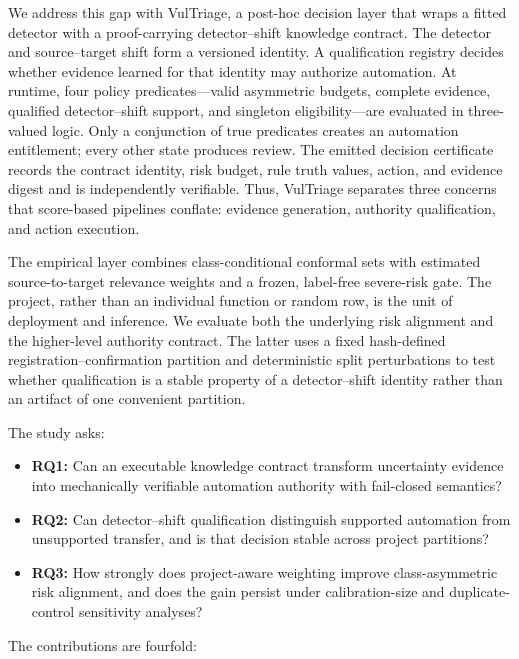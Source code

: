 \documentclass[preprint,12pt]{elsarticle}
\newcommand{\method}{VulTriage\xspace}
\begin{document}
We address this gap with \method, a post-hoc decision layer that wraps a fitted detector with a proof-carrying detector--shift knowledge contract. The detector and source--target shift form a versioned identity. A qualification registry decides whether evidence learned for that identity may authorize automation. At runtime, four policy predicates---valid asymmetric budgets, complete evidence, qualified detector--shift support, and singleton eligibility---are evaluated in three-valued logic. Only a conjunction of true predicates creates an automation entitlement; every other state produces review. The emitted decision certificate records the contract identity, risk budget, rule truth values, action, and evidence digest and is independently verifiable. Thus, \method separates three concerns that score-based pipelines conflate: evidence generation, authority qualification, and action execution.

The empirical layer combines class-conditional conformal sets with estimated source-to-target relevance weights and a frozen, label-free severe-risk gate. The project, rather than an individual function or random row, is the unit of deployment and inference. We evaluate both the underlying risk alignment and the higher-level authority contract. The latter uses a fixed hash-defined registration--confirmation partition and deterministic split perturbations to test whether qualification is a stable property of a detector--shift identity rather than an artifact of one convenient partition.

The study asks:

\begin{itemize}
  \item \textbf{RQ1:} Can an executable knowledge contract transform uncertainty evidence into mechanically verifiable automation authority with fail-closed semantics?
  \item \textbf{RQ2:} Can detector--shift qualification distinguish supported automation from unsupported transfer, and is that decision stable across project partitions?
  \item \textbf{RQ3:} How strongly does project-aware weighting improve class-asymmetric risk alignment, and does the gain persist under calibration-size and duplicate-control sensitivity analyses?
\end{itemize}

The contributions are fourfold:
\end{document}
